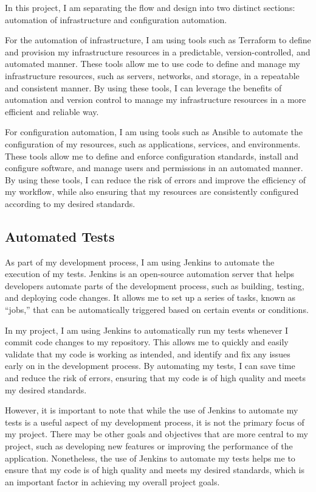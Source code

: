 \documentclass[
  10pt,
  paper=a4,
  ,captions=tableheading
]{scrartcl}
\begin{document}
In this project, I am separating the flow and design into two distinct
sections: automation of infrastructure and configuration automation.

For the automation of infrastructure, I am using tools such as Terraform
to define and provision my infrastructure resources in a predictable,
version-controlled, and automated manner. These tools allow me to use
code to define and manage my infrastructure resources, such as servers,
networks, and storage, in a repeatable and consistent manner. By using
these tools, I can leverage the benefits of automation and version
control to manage my infrastructure resources in a more efficient and
reliable way.

For configuration automation, I am using tools such as Ansible to
automate the configuration of my resources, such as applications,
services, and environments. These tools allow me to define and enforce
configuration standards, install and configure software, and manage
users and permissions in an automated manner. By using these tools, I
can reduce the risk of errors and improve the efficiency of my workflow,
while also ensuring that my resources are consistently configured
according to my desired standards.

\hypertarget{automated-tests}{%
\subsection{Automated Tests}\label{automated-tests}}

As part of my development process, I am using Jenkins to automate the
execution of my tests. Jenkins is an open-source automation server that
helps developers automate parts of the development process, such as
building, testing, and deploying code changes. It allows me to set up a
series of tasks, known as ``jobs,'' that can be automatically triggered
based on certain events or conditions.

In my project, I am using Jenkins to automatically run my tests whenever
I commit code changes to my repository. This allows me to quickly and
easily validate that my code is working as intended, and identify and
fix any issues early on in the development process. By automating my
tests, I can save time and reduce the risk of errors, ensuring that my
code is of high quality and meets my desired standards.

However, it is important to note that while the use of Jenkins to
automate my tests is a useful aspect of my development process, it is
not the primary focus of my project. There may be other goals and
objectives that are more central to my project, such as developing new
features or improving the performance of the application. Nonetheless,
the use of Jenkins to automate my tests helps me to ensure that my code
is of high quality and meets my desired standards, which is an important
factor in achieving my overall project goals.
\end{document}
